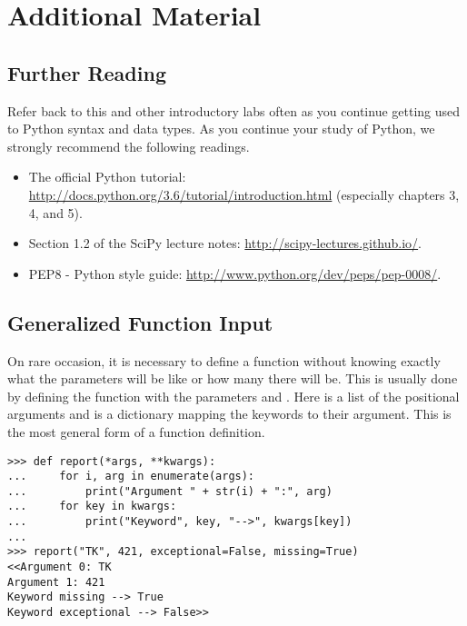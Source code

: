 \newpage

\section*{Additional Material} %

\subsection*{Further Reading} %

Refer back to this and other introductory labs often as you continue getting used to Python syntax and data types.
As you continue your study of Python, we strongly recommend the following readings.
\begin{itemize}
\item The official Python tutorial: \url{http://docs.python.org/3.6/tutorial/introduction.html} (especially chapters 3, 4, and 5).
\item Section 1.2 of the SciPy lecture notes: \url{http://scipy-lectures.github.io/}.
\item PEP8 - Python style guide: \url{http://www.python.org/dev/peps/pep-0008/}.
\end{itemize}

\subsection*{Generalized Function Input} %

On rare occasion, it is necessary to define a function without knowing exactly what the parameters will be like or how many there will be.
This is usually done by defining the function with the parameters  and .
Here  is a list of the positional arguments and  is a dictionary mapping the keywords to their argument.
This is the most general form of a function definition.

\begin{lstlisting}
>>> def report(*args, **kwargs):
...     for i, arg in enumerate(args):
...         print("Argument " + str(i) + ":", arg)
...     for key in kwargs:
...         print("Keyword", key, "-->", kwargs[key])
...
>>> report("TK", 421, exceptional=False, missing=True)
<<Argument 0: TK
Argument 1: 421
Keyword missing --> True
Keyword exceptional --> False>>
\end{lstlisting}


